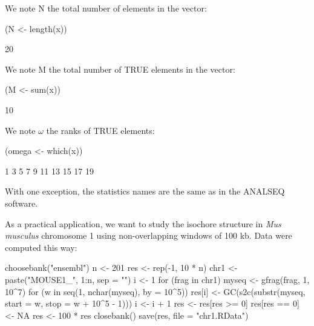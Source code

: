\documentclass{article}
\begin{document}
We note $\mathrm{N}$ the total number of elements in the vector:

\begin{Schunk}
\begin{Sinput}
 (N <- length(x))
\end{Sinput}
\begin{Soutput}
[1] 20
\end{Soutput}
\end{Schunk}

We note $\mathrm{M}$ the total number of TRUE elements in the vector:

\begin{Schunk}
\begin{Sinput}
 (M <- sum(x))
\end{Sinput}
\begin{Soutput}
[1] 10
\end{Soutput}
\end{Schunk}

We note $\omega$ the ranks of TRUE elements:

\begin{Schunk}
\begin{Sinput}
 (omega <- which(x))
\end{Sinput}
\begin{Soutput}
 [1]  1  3  5  7  9 11 13 15 17 19
\end{Soutput}
\end{Schunk}

With one exception, the statistics names are the same as in the ANALSEQ software.

As a practical application, we want to study the isochore structure in \textit{Mus
musculus} chromosome 1 using non-overlapping windows of 100 kb. Data were 
computed this way:

%
%
\begin{Schunk}
\begin{Sinput}
 choosebank("ensembl")
 n <- 201
 res <- rep(-1, 10 * n)
 chr1 <- paste("MOUSE1_", 1:n, sep = "")
 i <- 1
 for (frag in chr1) {
     myseq <- gfrag(frag, 1, 10^7)
     for (w in seq(1, nchar(myseq), by = 10^5)) {
         res[i] <- GC(s2c(substr(myseq, start = w, stop = w + 
             10^5 - 1)))
         i <- i + 1
     }
 }
 res <- res[res >= 0]
 res[res == 0] <- NA
 res <- 100 * res
 closebank()
 save(res, file = "chr1.RData")
\end{Sinput}
\end{Schunk}
\end{document}
